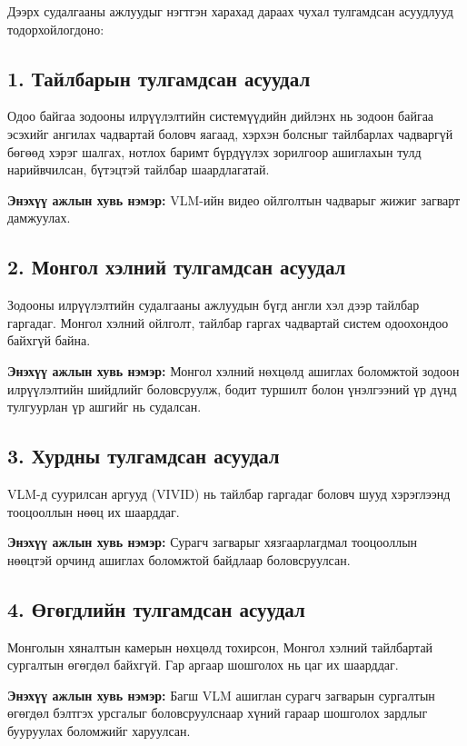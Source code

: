 Дээрх судалгааны ажлуудыг нэгтгэн харахад дараах чухал тулгамдсан асуудлууд тодорхойлогдоно:

\subsection*{1. Тайлбарын тулгамдсан асуудал}

Одоо байгаа зодооны илрүүлэлтийн системүүдийн дийлэнх нь зодоон байгаа эсэхийг ангилах чадвартай боловч яагаад, хэрхэн болсныг тайлбарлах чадваргүй бөгөөд хэрэг шалгах, нотлох баримт бүрдүүлэх зорилгоор ашиглахын тулд нарийвчилсан, бүтэцтэй тайлбар шаардлагатай.

\textbf{Энэхүү ажлын хувь нэмэр:} VLM-ийн видео ойлголтын чадварыг жижиг загварт дамжуулах.

\subsection*{2. Монгол хэлний тулгамдсан асуудал}

Зодооны илрүүлэлтийн судалгааны ажлуудын бүгд англи хэл дээр тайлбар гаргадаг. Монгол хэлний ойлголт, тайлбар гаргах чадвартай систем одоохондоо байхгүй байна.

\textbf{Энэхүү ажлын хувь нэмэр:} Монгол хэлний нөхцөлд ашиглах боломжтой зодоон илрүүлэлтийн шийдлийг боловсруулж, бодит туршилт болон үнэлгээний үр дүнд тулгуурлан үр ашгийг нь судалсан.

\subsection*{3. Хурдны тулгамдсан асуудал}

VLM-д суурилсан аргууд (VIVID) нь тайлбар гаргадаг боловч шууд хэрэглээнд тооцооллын нөөц их шаарддаг.

\textbf{Энэхүү ажлын хувь нэмэр:} Сурагч загварыг хязгаарлагдмал тооцооллын нөөцтэй орчинд ашиглах боломжтой байдлаар боловсруулсан.

\subsection*{4. Өгөгдлийн тулгамдсан асуудал}

Монголын хяналтын камерын нөхцөлд тохирсон, Монгол хэлний тайлбартай сургалтын өгөгдөл байхгүй. Гар аргаар шошголох нь цаг их шаарддаг.

\textbf{Энэхүү ажлын хувь нэмэр:} Багш VLM ашиглан сурагч загварын сургалтын өгөгдөл бэлтгэх урсгалыг боловсруулснаар хүний гараар шошголох зардлыг бууруулах боломжийг харуулсан.

